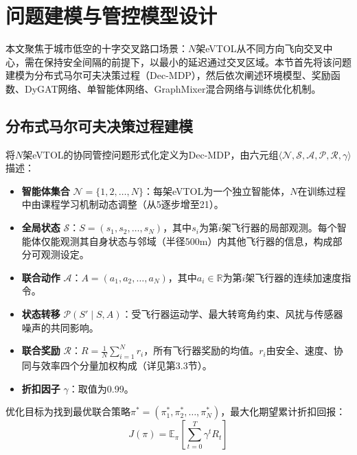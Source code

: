 \documentclass[12pt,a4paper,UTF8]{ctexart}
\begin{document}
\section{问题建模与管控模型设计}

本文聚焦于城市低空的十字交叉路口场景：$N$架eVTOL从不同方向飞向交叉中心，需在保持安全间隔的前提下，以最小的延迟通过交叉区域。本节首先将该问题建模为分布式马尔可夫决策过程（Dec-MDP），然后依次阐述环境模型、奖励函数、DyGAT网络、单智能体网络、GraphMixer混合网络与训练优化机制。

\subsection{分布式马尔可夫决策过程建模}

将$N$架eVTOL的协同管控问题形式化定义为Dec-MDP，由六元组$\langle \mathcal{N}, \mathcal{S}, \mathcal{A}, \mathcal{P}, \mathcal{R}, \gamma \rangle$描述：

\begin{itemize}
    \item \textbf{智能体集合} $\mathcal{N} = \{1, 2, \ldots, N\}$：每架eVTOL为一个独立智能体，$N$在训练过程中由课程学习机制动态调整（从5逐步增至21）。
    \item \textbf{全局状态} $\mathcal{S}$：$S = (s_1, s_2, \ldots, s_N)$，其中$s_i$为第$i$架飞行器的局部观测。每个智能体仅能观测其自身状态与邻域（半径500m）内其他飞行器的信息，构成部分可观测设定。
    \item \textbf{联合动作} $\mathcal{A}$：$A = (a_1, a_2, \ldots, a_N)$，其中$a_i \in \mathbb{R}$为第$i$架飞行器的连续加速度指令。
    \item \textbf{状态转移} $\mathcal{P}(S' \mid S, A)$：受飞行器运动学、最大转弯角约束、风扰与传感器噪声的共同影响。
    \item \textbf{联合奖励} $\mathcal{R}$：$R = \frac{1}{N}\sum_{i=1}^{N} r_i$，所有飞行器奖励的均值。$r_i$由安全、速度、协同与效率四个分量加权构成（详见第3.3节）。
    \item \textbf{折扣因子} $\gamma$：取值为0.99。
\end{itemize}

优化目标为找到最优联合策略$\pi^* = (\pi_1^*, \pi_2^*, \ldots, \pi_N^*)$，最大化期望累计折扣回报：
\begin{equation}
    J(\pi) = \mathbb{E}_{\pi}\left[\sum_{t=0}^{T} \gamma^t R_t\right]
\end{equation}
\end{document}

